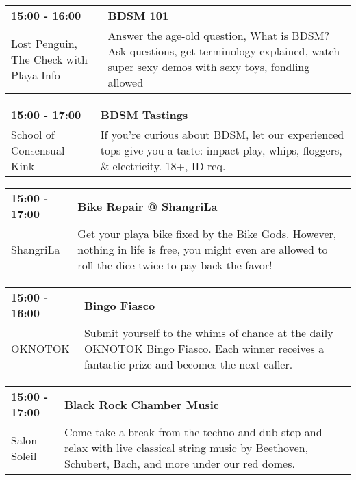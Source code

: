 \begin{tabular}{ p{1in} p{2.2in} }
    \textbf{15:00 - 16:00} & \textbf{BDSM 101} \\
    Lost Penguin, The \newline Check with Playa Info & Answer the age-old question, What is BDSM? Ask questions, get terminology explained, watch super sexy demos with sexy toys, fondling allowed \\
    \hline 
\end{tabular}
    
\begin{tabular}{ p{1in} p{2.2in} }
    \textbf{15:00 - 17:00} & \textbf{BDSM Tastings} \\
    School of Consensual Kink \newline  & If you're curious about BDSM, let our experienced tops give you a taste: impact play, whips, floggers, \& electricity. 18+, ID req. \\
    \hline 
\end{tabular}
    
\begin{tabular}{ p{1in} p{2.2in} }
    \textbf{15:00 - 17:00} & \textbf{Bike Repair @ ShangriLa} \\
    ShangriLa \newline  & Get your playa bike fixed by the Bike Gods. However, nothing in life is free, you might even are allowed to roll the dice twice to pay back the favor! \\
    \hline 
\end{tabular}
    
\begin{tabular}{ p{1in} p{2.2in} }
    \textbf{15:00 - 16:00} & \textbf{Bingo Fiasco} \\
    OKNOTOK \newline  & Submit yourself to the whims of chance at the daily OKNOTOK Bingo Fiasco. Each winner receives a fantastic prize and becomes the next caller. \\
    \hline 
\end{tabular}
    
\begin{tabular}{ p{1in} p{2.2in} }
    \textbf{15:00 - 17:00} & \textbf{Black Rock Chamber Music} \\
    Salon Soleil \newline  & Come take a break from the techno and dub step and relax with live classical string music by Beethoven, Schubert, Bach, and more under our red domes. \\
    \hline 
\end{tabular}
    
